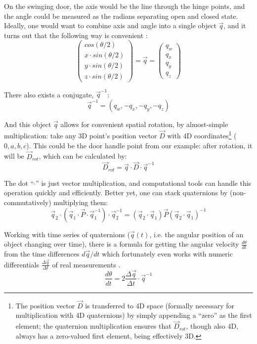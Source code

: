On the swinging door, the axis would be the line through the hinge points, and the angle could be measured as the radians separating open and closed state.
Ideally, one would want to combine axis and angle into a single object \(\vec{q}\), and it turns out that the following way is convenient \citep{Pennestri2010,Challis2020,Flashner2019}:
\begin{equation}\label{eqn:quaternion}
\begin{pmatrix}cos(\theta/2)\\x\cdot sin(\theta/2)\\y\cdot sin(\theta/2)\\z\cdot sin(\theta/2) \end{pmatrix} = \vec{q} = \begin{pmatrix}q_w\\q_x\\q_y\\q_z \end{pmatrix}
\end{equation}

There also exists a conjugate, \(\vec{q}^{-1}\):
\[\vec{q}^{-1} = (q_w, -q_x, -q_y, -q_z)\]


And this object \(\vec{q}\) allows for convenient spatial rotation, by almost-simple multiplication:
take any 3D point's position vector \(\vec{D}\) with 4D coordinates\footnote{The position vector \(\vec{D}\) is transferred to 4D space (formally necessary for multiplication with 4D quaternions) by simply appending a ``zero'' as the first element; the quaternion multiplication ensures that \(\vec{D}_{rot}\), though also 4D, always has a zero-valued first element, being effectively 3D.} (\(0, a, b, c\)).
This could be the door handle point from our example: after rotation, it will be \(\vec{D}_{rot}\), which can be calculated by:
\[\vec{D}_{rot} = \vec{q}\cdot \vec{D}\cdot \vec{q}^{-1}\]


The dot ``\(\cdot\)'' is just vector multiplication, and computational tools can handle this operation quickly and efficiently.
Better yet, one can stack quaternions by (non-commutatively) multiplying them:
\[ \vec{q}_2 \cdot \left( \vec{q}_1\cdot \vec{P}\cdot \vec{q}_1^{-1}\right) \cdot \vec{q}_2^{-1} = (\vec{q}_2\cdot \vec{q}_1) \vec{P} (\vec{q}_2\cdot \vec{q}_1)^{-1} \]

Working with time series of quaternions (\(\vec{q}(t)\), i.e. the angular position of an object changing over time), there is a formula for getting the angular velocity \(\frac{d\theta}{dt}\) from the time differences \(d\vec{q}/dt\) which fortunately even works with numeric differentials \(\frac{\Delta \vec{q}}{\Delta t}\) of real measurements \citep{Baker1999}.
\[\frac{d\theta}{dt} = 2 \frac{\Delta \vec{q}}{\Delta t} \cdot \vec{q}^{-1} \]

